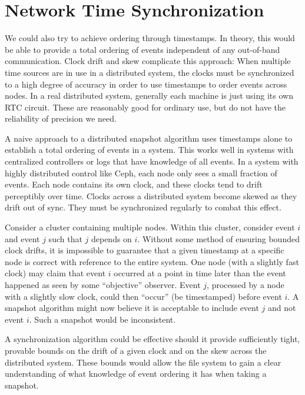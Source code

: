 \section{Network Time Synchronization}

We could also try to achieve ordering through timestamps. In theory,
this would be able to provide a total ordering of events independent
of any out-of-band communication. Clock drift and skew complicate this
approach: When multiple time sources are in use in a distributed system,
the clocks must be synchronized to a high degree of accuracy in order
to use timestamps to order events across nodes. In a real distributed
system, generally each machine is just using its own RTC
circuit. These are reasonably good for ordinary use, but do not have
the reliability of precision we need. %

A naive approach to a distributed snapshot algorithm uses timestamps
alone to establish a total ordering of events in a system. This works
well in systems with centralized controllers or logs that have
knowledge of all events. In a system with highly distributed control
like Ceph, each node only sees a small fraction of events. Each node
contains its own clock, and these clocks tend to drift perceptibly
over time. Clocks across a distributed system become skewed as they
drift out of sync. They must be synchronized regularly to combat this
effect.

Consider a cluster containing multiple nodes. Within this cluster,
consider event $i$ and event $j$ such that $j$ depends on $i$. Without
some method of ensuring bounded clock drifts, it is impossible to
guarantee that a given timestamp at a specific node is correct with
reference to the entire system. One node (with a slightly fast clock)
may claim that event $i$ occurred at a point in time later than the
event happened as seen by some ``objective'' observer. Event $j$,
processed by a node with a slightly slow clock, could then ``occur''
(be timestamped) before event $i$. A snapshot algorithm might now
believe it is acceptable to include event $j$ and not event $i$. Such
a snapshot would be inconsistent.

A synchronization algorithm could be effective should it provide
sufficiently tight, provable bounds on the drift of a given clock and
on the skew across the distributed system. These bounds would allow
the file system to gain a clear understanding of what knowledge of
event ordering it has when taking a snapshot.

